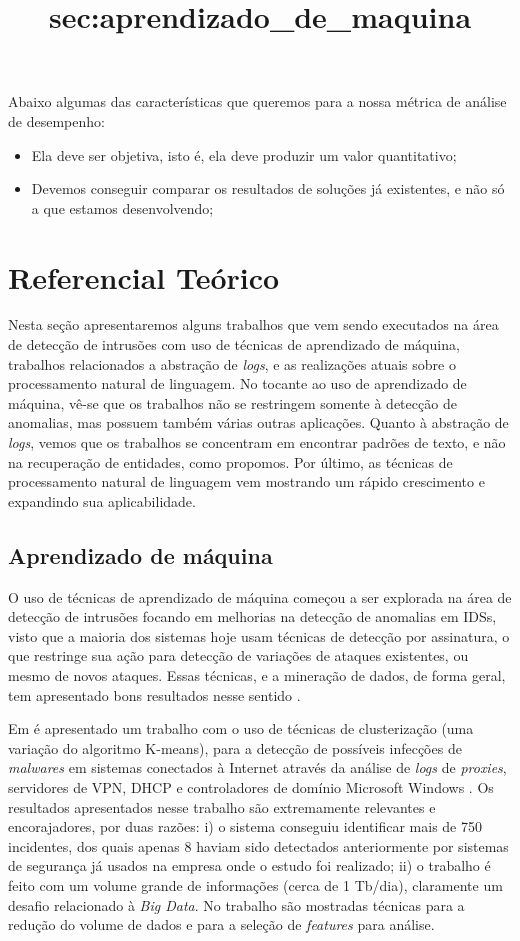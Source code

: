 \documentclass[
	12pt,				%
	openright,			%
	twoside,			%
	a4paper,			%
	english,			%
	spanish,			%
	brazil,				%
	]{abntex2}
\begin{document}
Abaixo algumas das características que queremos para a nossa métrica de análise de desempenho:

\begin{itemize}
	\item Ela deve ser objetiva, isto é, ela deve produzir um valor quantitativo;
	\item Devemos conseguir comparar os resultados de soluções já existentes, e não só a que estamos desenvolvendo;
\end{itemize}

\chapter{Referencial Teórico}\label{chap:referencial}

Nesta seção apresentaremos alguns trabalhos que vem sendo executados na área de detecção de intrusões com uso de técnicas de aprendizado de máquina, trabalhos relacionados a abstração de \emph{logs}, e as realizações atuais sobre o processamento natural de linguagem. No tocante ao uso de aprendizado de máquina, vê-se que os trabalhos não se restringem somente à detecção de anomalias, mas possuem também várias outras aplicações. Quanto à abstração de \emph{logs}, vemos que os trabalhos se concentram em encontrar padrões de texto, e não na recuperação de entidades, como propomos. Por último, as técnicas de processamento natural de linguagem vem mostrando um rápido crescimento e expandindo sua aplicabilidade.

\section{Aprendizado de máquina}\title{sec:aprendizado_de_maquina}
O uso de técnicas de aprendizado de máquina começou a ser explorada na área de detecção de intrusões focando em melhorias na detecção de anomalias em IDSs, visto que a maioria dos sistemas hoje usam técnicas de detecção por assinatura, o que restringe sua ação para detecção de variações de ataques existentes, ou mesmo de novos ataques. Essas técnicas, e a mineração de dados, de forma geral, tem apresentado bons resultados nesse sentido \cite{dua2011data, yen2013beehive, zomlot2013aiding, ganapathy2012intelligent, li2013automatic, joseph2012machine}.

Em \cite{yen2013beehive} é apresentado um trabalho com o uso de técnicas de clusterização (uma variação do algoritmo K-means\cite{ball1967clustering}), para a detecção de possíveis infecções de \emph{malwares} em sistemas conectados à Internet através da análise de \emph{logs} de \emph{proxies}, servidores de VPN, DHCP e controladores de domínio Microsoft Windows \texttrademark. Os resultados apresentados nesse trabalho são extremamente relevantes e encorajadores, por duas razões: i) o sistema conseguiu identificar mais de 750 incidentes, dos quais apenas 8 haviam sido detectados anteriormente por sistemas de segurança já usados na empresa onde o estudo foi realizado; ii) o trabalho é feito com um volume grande de informações (cerca de 1 Tb/dia), claramente um desafio relacionado à \emph{Big Data}. No trabalho são mostradas técnicas para a redução do volume de dados e para a seleção de \emph{features} para análise.
\end{document}
